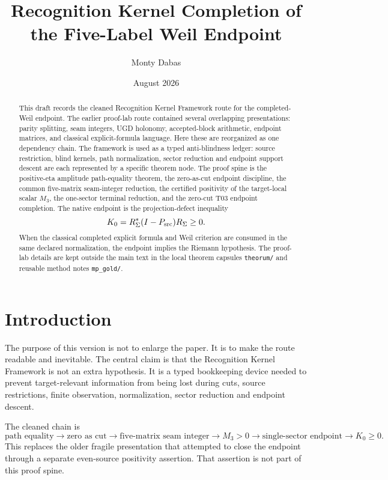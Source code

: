 \documentclass[11pt]{article}
\title{Recognition Kernel Completion of the Five-Label Weil Endpoint}
\author{Monty Dabas}
\date{August 2026}
\newcommand{\Psrc}{P_{\rm src}}
\newcommand{\RSigma}{R_\Sigma}
\begin{document}
\maketitle

\begin{abstract}
This draft records the cleaned Recognition Kernel Framework route for the completed-Weil endpoint.  The earlier proof-lab route contained several overlapping presentations: parity splitting, seam integers, UGD holonomy, accepted-block arithmetic, endpoint matrices, and classical explicit-formula language.  Here these are reorganized as one dependency chain.  The framework is used as a typed anti-blindness ledger: source restriction, blind kernels, path normalization, sector reduction and endpoint support descent are each represented by a specific theorem node.  The proof spine is the positive-eta amplitude path-equality theorem, the zero-as-cut endpoint discipline, the common five-matrix seam-integer reduction, the certified positivity of the target-local scalar \(M_3\), the one-sector terminal reduction, and the zero-cut T03 endpoint completion.  The native endpoint is the projection-defect inequality
\[
K_0=\RSigma^*(I-\Psrc)\RSigma\ge0.
\]
When the classical completed explicit formula and Weil criterion are consumed in the same declared normalization, the endpoint implies the Riemann hypothesis.  The proof-lab details are kept outside the main text in the local theorem capsules \texttt{theorum/} and reusable method notes \texttt{mp\_gold/}.
\end{abstract}

\tableofcontents

\section{Introduction}

The purpose of this version is not to enlarge the paper.  It is to make the route readable and inevitable.  The central claim is that the Recognition Kernel Framework is not an extra hypothesis.  It is a typed bookkeeping device needed to prevent target-relevant information from being lost during cuts, source restrictions, finite observation, normalization, sector reduction and endpoint descent.

The cleaned chain is
\[
\text{path equality}
\longrightarrow
\text{zero as cut}
\longrightarrow
\text{five-matrix seam integer}
\longrightarrow
M_3>0
\longrightarrow
\text{single-sector endpoint}
\longrightarrow
K_0\ge0.
\]
This replaces the older fragile presentation that attempted to close the endpoint through a separate even-source positivity assertion.  That assertion is not part of this proof spine.
\end{document}
